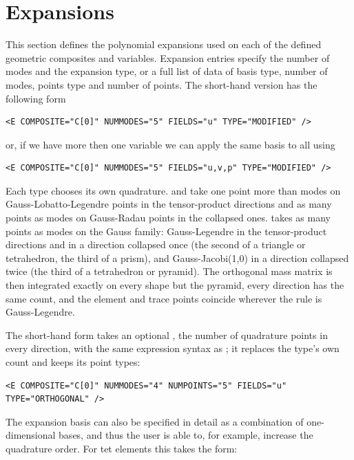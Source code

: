 \section{Expansions}
\label{sec:xml:expansions}
This section defines the polynomial expansions used on each of the defined
geometric composites and variables. Expansion entries specify the number of
modes and the expansion type, or a full list of data of basis type, number of
modes, points type and number of points. The short-hand version has the
following form

\begin{lstlisting}[style=XMLStyle]
<E COMPOSITE="C[0]" NUMMODES="5" FIELDS="u" TYPE="MODIFIED" />
\end{lstlisting}

or, if we have more then one variable we can apply the same basis to all using

\begin{lstlisting}[style=XMLStyle]
<E COMPOSITE="C[0]" NUMMODES="5" FIELDS="u,v,p" TYPE="MODIFIED" />
\end{lstlisting}

Each type chooses its own quadrature.  and
 take one point more than modes on
Gauss-Lobatto-Legendre points in the tensor-product directions and as many
points as modes on Gauss-Radau points in the collapsed ones.
 takes as many points as modes on the Gauss family:
Gauss-Legendre in the tensor-product directions and in a direction collapsed
once (the second of a triangle or tetrahedron, the third of a prism), and
Gauss-Jacobi(1,0) in a direction collapsed twice (the third of a tetrahedron
or pyramid). The orthogonal mass matrix is then integrated exactly on every
shape but the pyramid, every direction has the same count, and the element
and trace points coincide wherever the rule is Gauss-Legendre.

The short-hand form takes an optional , the number of
quadrature points in every direction, with the same expression syntax as
; it replaces the type's own count and keeps its point types:

\begin{lstlisting}[style=XMLStyle]
<E COMPOSITE="C[0]" NUMMODES="4" NUMPOINTS="5" FIELDS="u" TYPE="ORTHOGONAL" />
\end{lstlisting}

The expansion basis can also be specified in detail as a combination of
one-dimensional bases, and thus the user is able to, for example, increase the
quadrature order. For tet elements this takes the form:


